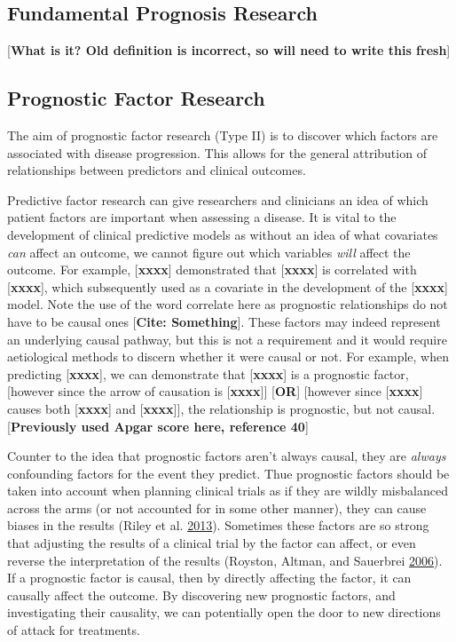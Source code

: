 \documentclass[
]{article}
\begin{document}
\hypertarget{fundamental-prognosis-research}{%
\subsection{Fundamental Prognosis Research}\label{fundamental-prognosis-research}}

{[}\textbf{What is it? Old definition is incorrect, so will need to write this fresh}{]}

\hypertarget{prognostic-factor-research}{%
\subsection{Prognostic Factor Research}\label{prognostic-factor-research}}

The aim of prognostic factor research (Type II) is to discover which factors are associated with disease progression. This allows for the general attribution of relationships between predictors and clinical outcomes.

Predictive factor research can give researchers and clinicians an idea of which patient factors are important when assessing a disease. It is vital to the development of clinical predictive models as without an idea of what covariates \emph{can} affect an outcome, we cannot figure out which variables \emph{will} affect the outcome. For example, {[}\textbf{xxxx}{]} demonstrated that {[}\textbf{xxxx}{]} is correlated with {[}\textbf{xxxx}{]}, which subsequently used as a covariate in the development of the {[}\textbf{xxxx}{]} model. Note the use of the word correlate here as prognostic relationships do not have to be causal ones {[}\textbf{Cite: Something}{]}. These factors may indeed represent an underlying causal pathway, but this is not a requirement and it would require aetiological methods to discern whether it were causal or not. For example, when predicting {[}\textbf{xxxx}{]}, we can demonstrate that {[}\textbf{xxxx}{]} is a prognostic factor, {[}however since the arrow of causation is {[}\textbf{xxxx}{]}{]} {[}\textbf{OR}{]} {[}however since {[}\textbf{xxxx}{]} causes both {[}\textbf{xxxx}{]} and {[}\textbf{xxxx}{]}{]}, the relationship is prognostic, but not causal. {[}\textbf{Previously used Apgar score here, reference 40}{]}

Counter to the idea that prognostic factors aren't always causal, they are \emph{always} confounding factors for the event they predict. Thue prognostic factors should be taken into account when planning clinical trials as if they are wildly misbalanced across the arms (or not accounted for in some other manner), they can cause biases in the results (Riley et al. \protect\hyperlink{ref-riley_prognosis_2013}{2013}). Sometimes these factors are so strong that adjusting the results of a clinical trial by the factor can affect, or even reverse the interpretation of the results (Royston, Altman, and Sauerbrei \protect\hyperlink{ref-royston_dichotomizing_2006}{2006}). If a prognostic factor is causal, then by directly affecting the factor, it can causally affect the outcome. By discovering new prognostic factors, and investigating their causality, we can potentially open the door to new directions of attack for treatments.
\end{document}
